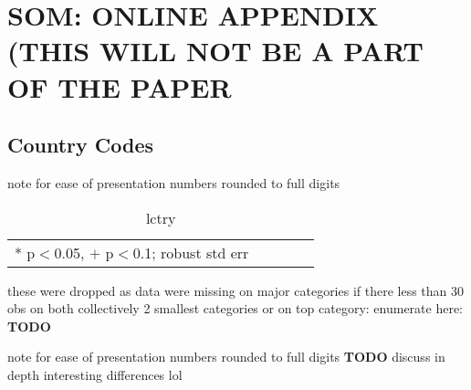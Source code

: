 \documentclass[10pt, letterpaper]{article}
\begin{document}






\section{SOM: ONLINE APPENDIX (THIS WILL NOT BE A PART OF THE PAPER}

\subsection{Country Codes}

note for ease of presentation numbers rounded to full digits
\begin{spacing}{.9} \begin{table}[H]\centering \caption{.} \label{d1} \begin{scriptsize} \begin{tabular}{lllll}\hline  \hline   * p$<$0.05, $+$ p$<$0.1; robust std err \end{tabular}\end{scriptsize}\caption{lctry}\end{table} \end{spacing}
these were dropped as data were missing on major categories if there less than
30 obs on both collectively 2 smallest categories or on top category: enumerate here:
\textbf{TODO}

note for ease of presentation numbers rounded to full digits
\textbf{TODO} discuss in depth interesting differences lol
\end{document}
